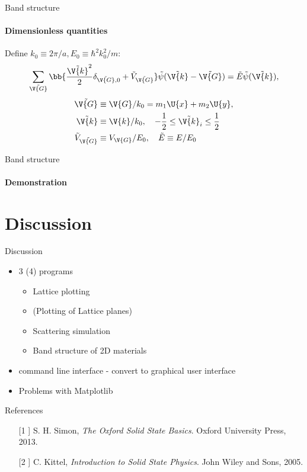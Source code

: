 \documentclass{beamer}
\begin{document}
\begin{frame}{Band structure}
\framesubtitle{Dimensionless quantities}
Define $ k_0 \equiv 2\pi/a, E_0 \equiv \hbar^2 k_0^2/m $:
\begin{equation*}
	\sum_{\tilde{\V{G}}} \bb{\frac{\tilde{\V{k}}^2}{2} \delta_{\tilde{\V{G}},0} + \tilde{V}_{\tilde{\V{G}}}} \tilde{\psi}(\tilde{\V{k}} - \tilde{\V{G}}) = \tilde{E} \tilde{\psi}(\tilde{\V{k}}),
\end{equation*}
\pause
\begin{align*}
	\tilde{\V{G}} &\equiv \V{G}/k_0 = m_1 \U{x}+m_2 \U{y}, \\
	\tilde{\V{k}} &\equiv \V{k}/k_0, \quad -\frac{1}{2} \leq \tilde{\V{k}}_i \leq \frac{1}{2}\\
	\tilde{V}_{\tilde{\V{G}}} &\equiv V_{\V{G}} / E_0, \quad \tilde{E} \equiv E/E_0
\end{align*}
\end{frame}

\begin{frame}{Band structure}
\framesubtitle{Demonstration}
\end{frame}



\section{Discussion}
\begin{frame}{Discussion}
\begin{itemize}
	\item 3 (4) programs
	\begin{itemize}
		\item Lattice plotting
		\item (Plotting of Lattice planes)
		\item Scattering simulation
		\item Band structure of 2D materials
	\end{itemize}
	\item command line interface - convert to graphical user interface
	\item Problems with Matplotlib
\end{itemize}
\end{frame}

\begin{frame}{References}
	\begin{enumerate}
		\item[[1]] S. H. Simon, \textit{The Oxford Solid State Basics}. Oxford University Press, 2013.
		\item[[2]] C. Kittel, \textit{Introduction to Solid State Physics}. John Wiley and Sons, 2005.
	\end{enumerate}
\end{frame}
\end{document}

